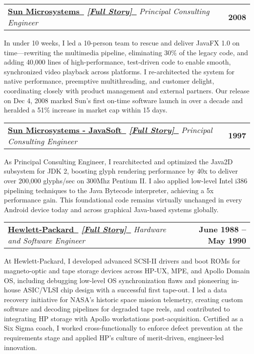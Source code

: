\documentclass[letterpaper,11pt]{article}
\makeatletter
\newcommand{\resumeItem}[1]{
    \item\small{
            {#1 \vspace{-2pt}}
    }
}
\newcommand{\resumeSubheading}[4]{
    \vspace{-2pt}\item
    \begin{tabular*}{1.0\textwidth}[t]{l@{\extracolsep{\fill}}r}
    \textbf{#1}  \textit{\small#3} & \textbf{\small #2} \\
    \end{tabular*}\vspace{-7pt}
}
\makeatother
\begin{document}
\resumeSubheading
{\href{https://www.oracle.com/sun}{Sun Microsystems~\faExternalLink}
\quad\small
\textit{
\href{https://paul-charlton.vercel.app/story/4}{[Full Story]~{\fontspec{Symbola}\symbol{"1F517}}}}
}
{2008}
{Principal Consulting Engineer}
{Santa Clara, CA}
\resumeItem{
In under 10 weeks, I led a 10-person team to rescue and deliver JavaFX 1.0 on time—rewriting the multimedia pipeline, eliminating 30\% of the legacy code, and adding 40,000 lines of high-performance, test-driven code to enable smooth, synchronized video playback across platforms. I re-architected the system for native performance, preemptive multithreading, and customer delight, coordinating closely with product management and external partners. Our release on Dec 4, 2008 marked Sun’s first on-time software launch in over a decade and heralded a 51\% increase in market cap within 15 days.
}
\newpage
\resumeSubheading
{\href{https://www.oracle.com/sun}{Sun Microsystems - JavaSoft~\faExternalLink}
\quad\small
\textit{
\href{https://paul-charlton.vercel.app/story/5}{[Full Story]~{\fontspec{Symbola}\symbol{"1F517}}}}
}
{1997}
{Principal Consulting Engineer}
{Palo Alto, CA}
\resumeItem{
As Principal Consulting Engineer, I rearchitected and optimized the Java2D subsystem for JDK 2, boosting glyph rendering performance by 40x to deliver over 200,000 glyphs/sec on 300Mhz Pentium II. I also applied low-level Intel i386 pipelining techniques to the Java Bytecode interpreter, achieving a 5x performance gain. This foundational code remains virtually unchanged in every Android device today and across graphical Java-based systems globally.
}

\resumeSubheading
{\href{https://www.hp.com}{Hewlett-Packard~\faExternalLink}
\quad\small
\textit{
\href{https://paul-charlton.vercel.app/story/38}{[Full Story]~{\fontspec{Symbola}\symbol{"1F517}}}}
}
{June 1988 -- May 1990}
{Hardware and Software Engineer}
{Greeley, CO}
\resumeItem{
At Hewlett-Packard, I developed advanced SCSI-II drivers and boot ROMs for magneto-optic and tape storage devices across HP-UX, MPE, and Apollo Domain OS, including debugging low-level OS synchronization flaws and pioneering in-house ASIC/VLSI chip design with a successful first tape-out. I led a data recovery initiative for NASA's historic space mission telemetry, creating custom software and decoding pipelines for degraded tape reels, and contributed to integrating HP storage with Apollo workstations post-acquisition. Certified as a Six Sigma coach, I worked cross-functionally to enforce defect prevention at the requirements stage and applied HP's culture of merit-driven, engineer-led innovation.
}
\end{document}
